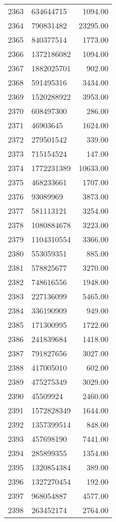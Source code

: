 \begin{table}[ht]
\begin{tabular}{rlr}
  2363 & 634644715 & 1094.00 \\ 
  2364 & 790831482 & 23295.00 \\ 
  2365 & 840377514 & 1773.00 \\ 
  2366 & 1372186082 & 1094.00 \\ 
  2367 & 1882025701 & 902.00 \\ 
  2368 & 591495316 & 3434.00 \\ 
  2369 & 1520288922 & 3953.00 \\ 
  2370 & 608497300 & 286.00 \\ 
  2371 & 46903645 & 1624.00 \\ 
  2372 & 279501542 & 339.00 \\ 
  2373 & 715154524 & 147.00 \\ 
  2374 & 1772231389 & 10633.00 \\ 
  2375 & 468233661 & 1707.00 \\ 
  2376 & 93089969 & 3873.00 \\ 
  2377 & 581113121 & 3254.00 \\ 
  2378 & 1080884678 & 3223.00 \\ 
  2379 & 1104310554 & 3366.00 \\ 
  2380 & 553059351 & 885.00 \\ 
  2381 & 578825677 & 3270.00 \\ 
  2382 & 748616556 & 1948.00 \\ 
  2383 & 227136099 & 5465.00 \\ 
  2384 & 336190909 & 949.00 \\ 
  2385 & 171300995 & 1722.00 \\ 
  2386 & 241839684 & 1418.00 \\ 
  2387 & 791827656 & 3027.00 \\ 
  2388 & 417005010 & 602.00 \\ 
  2389 & 475275349 & 3029.00 \\ 
  2390 & 45509924 & 2460.00 \\ 
  2391 & 1572828349 & 1644.00 \\ 
  2392 & 1357399514 & 848.00 \\ 
  2393 & 457698190 & 7441.00 \\ 
  2394 & 285899355 & 1354.00 \\ 
  2395 & 1320854384 & 389.00 \\ 
  2396 & 1327270454 & 192.00 \\ 
  2397 & 968054887 & 4577.00 \\ 
  2398 & 263452174 & 2764.00 \\ 

\end{tabular}
\end{table}

